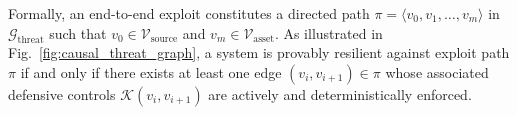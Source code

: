 Formally, an end-to-end exploit constitutes a directed path $\pi = \langle v_0, v_1, \dots, v_m \rangle$ in $\mathcal{G}_{\text{threat}}$ such that $v_0 \in \mathcal{V}_{\text{source}}$ and $v_m \in \mathcal{V}_{\text{asset}}$. As illustrated in Fig.~\ref{fig:causal_threat_graph}, a system is provably resilient against exploit path $\pi$ if and only if there exists at least one edge $(v_i, v_{i+1}) \in \pi$ whose associated defensive controls $\mathcal{K}(v_i, v_{i+1})$ are actively and deterministically enforced.


